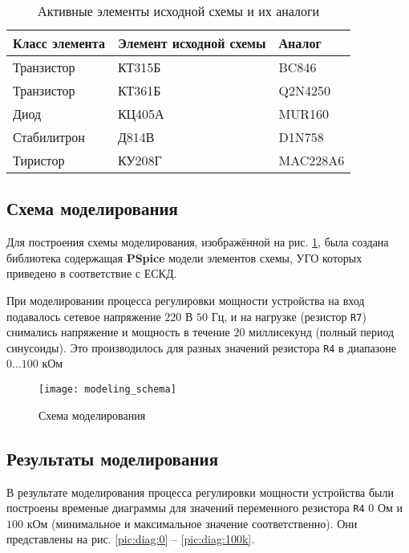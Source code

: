 \begin{table}[H]
\begin{center}
	\caption{Активные элементы исходной схемы и их аналоги}
	\label{tab:elements_analogs}
	\def\tabcolsep{10pt}
	\begin{tabular}{|l|l|l|}
		\hline
		Класс элемента &
		Элемент исходной схемы & 
		Аналог \\
		\hline
		Транзистор &
		КТ315Б &
		BC846 \\
		\hline
		Транзистор &
		КТ361Б &
		Q2N4250 \\
		\hline
		Диод &
		КЦ405А &
		MUR160 \\
		\hline
		Стабилитрон &
		Д814В &
		D1N758 \\
		\hline
		Тиристор &
		КУ208Г &
		MAC228A6 \\
		\hline
\end{tabular}
\end{center}
\end{table}

\subsection{Схема моделирования}

Для построения схемы моделирования, изображённой на рис. \ref{pic:mod_scheme}, была создана библиотека содержащая \textbf{PSpice} модели элементов схемы, УГО которых приведено  в соответствие с ЕСКД. 

При моделировании процесса регулировки мощности устройства на вход подавалось сетевое напряжение $220$ В $50$ Гц, и на нагрузке (резистор \verb+R7+) снимались напряжение и мощность в течение $20$ миллисекунд (полный период синусоиды). Это производилось для разных значений резистора \verb+R4+ в диапазоне $0\dots100$ кОм

\begin{figure}[H]
\begin{center}
	\texttt{[image: modeling\_schema]}
	\caption{Схема моделирования}
	\label{pic:mod_scheme}
\end{center}
\end{figure}

\subsection{Результаты моделирования}

В результате моделирования процесса регулировки мощности устройства были построены временые диаграммы для значений переменного резистора \verb+R4+ $0$ Ом и $100$ кОм (минимальное и максимальное значение соответственно). Они представлены на рис. \ref{pic:diag:0} -- \ref{pic:diag:100k}.

